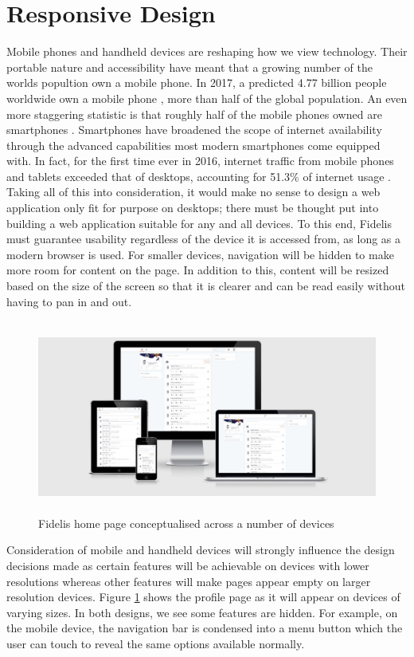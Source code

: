 \section{Responsive Design}
Mobile phones and handheld devices are reshaping how we view technology. Their portable nature and accessibility have meant that a growing number of the worlds popultion own a mobile phone. In 2017, a predicted 4.77 billion people worldwide own a mobile phone \cite{Statista:Mobile}, more than half of the global population. An even more staggering statistic is that roughly half of the mobile phones owned are smartphones \cite{Statista:Smartphones}. Smartphones have broadened the scope of internet availability through the advanced capabilities most modern smartphones come equipped with. In fact, for the first time ever in 2016, internet traffic from mobile phones and tablets exceeded that of desktops, accounting for 51.3\% of internet usage \cite{StatCounter:MobileInternetTraffic}. Taking all of this into consideration, it would make no sense to design a web application only fit for purpose on desktops; there must be thought put into building a web application suitable for any and all devices. To this end, Fidelis must guarantee usability regardless of the device it is accessed from, as long as a modern browser is used. For smaller devices, navigation will be hidden to make more room for content on the page. In addition to this, content will be resized based on the size of the screen so that it is clearer and can be read easily without having to pan in and out.

\begin{figure}[H]
	\centering
	\includegraphics[height=2.5in]{Images/Design/ResponsivePages}
	\caption{Fidelis home page conceptualised across a number of devices}
	\label{fig:responsive}
\end{figure}

Consideration of mobile and handheld devices will strongly influence the design decisions made as certain features will be achievable on devices with lower resolutions whereas other features will make pages appear empty on larger resolution devices. Figure \ref{fig:responsive} shows the profile page as it will appear on devices of varying sizes. In both designs, we see some features are hidden. For example, on the mobile device, the navigation bar is condensed into a menu button which the user can touch to reveal the same options available normally. 